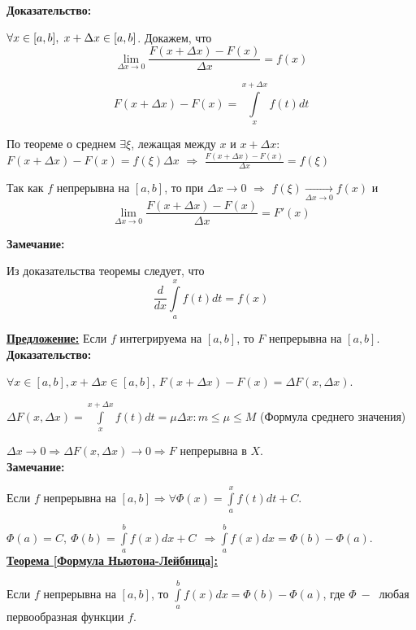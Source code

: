 \documentclass[a4paper,12pt]{article} %
\renewcommand {\leq}{\leqslant}
\begin{document}
\textbf{Доказательство:}

$ \forall x \in [a, b], \hspace{1mm} x + \Delta x \in [a, b] $. Докажем, что $$ \lim\limits_{\Delta x  \rightarrow 0} \frac{F(x + \Delta x) - F(x) }{\Delta x} = f (x)$$

$$\displaystyle F(x + \Delta x) - F(x) = \int\limits_x^{x + \Delta x} f(t)dt$$

По теореме о среднем $\exists \xi$, лежащая между $ x $ и $ x + \Delta x:$ $ F(x + \Delta x ) - F(x) = f(\xi) \Delta x$ $\Rightarrow$ $\displaystyle \frac{F(x + \Delta x) - F(x)}{\Delta x} = f(\xi)$

Так как $ f $ непрерывна на $ [a,b] $, то при $ \Delta x \rightarrow 0$ $\Rightarrow$ $f (\xi) \xrightarrow[\Delta x \rightarrow 0]{} f (x)$ и \\ [2mm]

$$ \lim\limits_{\Delta x  \rightarrow 0} \frac{F(x + \Delta x) - F(x) }{\Delta x} = F' (x)$$ 

\textbf{Замечание:}

Из доказательства теоремы следует, что
$$\frac{d}{dx} \int\limits_a^x f(t)dt = f(x)$$

\underline{\textbf{Предложение:}} Если $f$ интегрируема на $[a,b]$, то $F$ непрерывна на $[a,b]$.\\

\textbf{Доказательство:}

$\forall x \in [a,b], x+\Delta x\in [a,b]$, $F (x+ \Delta x ) - F(x) = \Delta F(x, \Delta x)$.

$\Delta F(x, \Delta x) = \int\limits_x^{x + \Delta x} f(t)dt = \mu \Delta x : m \leq \mu \leq M $ (Формула среднего значения)

$\Delta x \rightarrow 0 \Rightarrow \Delta F(x, \Delta x) \rightarrow 0 \Rightarrow F$ непрерывна в $X$.\\

\textbf{Замечание:}

Если $f$ непрерывна на $[a,b] \Rightarrow \forall \Phi(x) =\int\limits_a^{x} f(t)dt +C $.

$\Phi(a) = C,~ \Phi(b)= \int\limits_a^{b} f(x)dx + C ~~\Rightarrow\int\limits_a^b f(x)dx = \Phi(b)-  \Phi(a) $.\\

\underline{\textbf{Теорема [Формула Ньютона-Лейбница]:}}

Если $f$ непрерывна на $[a,b]$, то $\int\limits_a^{b} f(x)dx = \Phi(b)-  \Phi(a) $, где $\Phi ~-~$ любая первообразная функции $f$.\\
\end{document}
